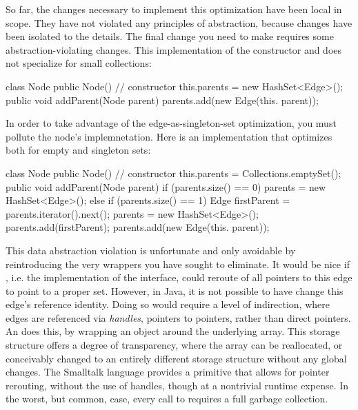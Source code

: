 So far, the changes necessary to implement this optimization have been local in
scope. They have not violated any principles of abstraction, because changes have
been isolated to the  details. The final change you need to make
requires some abstraction-violating changes. This implementation of the
constructor and  does not specialize for small collections:

\begin{shortlisting}
class Node {
  public Node() { // constructor
     this.parents = new HashSet<Edge>();
  }
  public void addParent(Node parent) {
     parents.add(new Edge(this. parent));
  }
}
\end{shortlisting} 

In order to take advantage of the edge-as-singleton-set optimization, you must
pollute the node's  implemnetation. Here is an implementation
that optimizes both for empty and singleton sets:

\begin{shortlisting}
class Node {
  public Node() { // constructor
     this.parents = Collections.emptySet();
  }
  public void addParent(Node parent) {
     if (parents.size() == 0) parents = new HashSet<Edge>();
     else if (parents.size() == 1) {
        Edge firstParent = parents.iterator().next();
        parents = new HashSet<Edge>();
        parents.add(firstParent);
     }
     parents.add(new Edge(this. parent));
  }
}
\end{shortlisting} 

This data abstraction violation is unfortunate and only avoidable by
reintroducing the very wrappers you have sought to eliminate. It would be nice if
, i.e. the implementation of the  interface, could
reroute of all pointers to this edge to point to a proper set. However, in Java,
it is not possible to have  change this edge's reference
identity. Doing so would require a level of indirection, where edges are
referenced via \emph{handles}, pointers to pointers, rather than direct
pointers. An  does this, by wrapping an object
around the underlying array. This storage structure offers a degree of
transparency, where the array can be reallocated, or conceivably changed to an
entirely different storage structure without any global changes. The Smalltalk
language provides a 
primitive that allows for pointer rerouting,
without the use of handles, though at a nontrivial runtime expense. In the worst,
but common, case, every call to  requires a full garbage collection.

